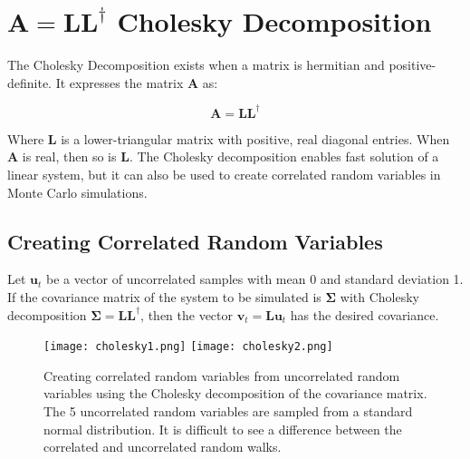 \section{$\mathbf{A} = \mathbf{L}\mathbf{L}^{\dagger}$ Cholesky Decomposition}
\label{sec:cholesky}

The Cholesky Decomposition exists when a matrix is hermitian and positive-definite. It expresses the matrix $\mathbf{A}$ as:

\begin{equation}
\mathbf{A} = \mathbf{L}\mathbf{L^\dagger}
\end{equation}

Where $\mathbf{L}$ is a lower-triangular matrix with positive, real diagonal entries. When $\mathbf{A}$ is real, then so is $\mathbf{L}$. The Cholesky decomposition enables fast solution of a linear system, but it can also be used to create correlated random variables in Monte Carlo simulations. 

\subsection{Creating Correlated Random Variables}
Let $\mathbf{u}_t$ be a vector of uncorrelated samples with mean 0 and 	standard deviation 1. If the covariance matrix of the system to be simulated is  $\mathbf{\Sigma}$ with Cholesky decomposition $\mathbf{\Sigma} = \mathbf{LL}^\dagger$, then the vector $\mathbf{v}_t = \mathbf{Lu}_t$ has the desired covariance.

\begin{figure}
\centering
\texttt{[image: cholesky1.png]}
\texttt{[image: cholesky2.png]}
\caption{Creating correlated random variables from uncorrelated random variables using the Cholesky decomposition of the covariance matrix. The 5 uncorrelated random variables are sampled from a standard normal distribution. It is difficult to see a difference between the correlated and uncorrelated random walks.}
\end{figure}

